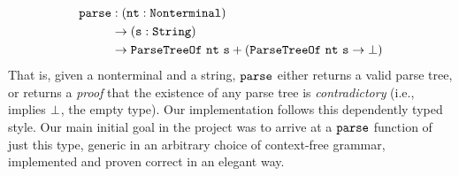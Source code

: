       \begin{align*}
        \fname{parse} & \oftypesep
        (\oftype{\farg{nt}}{\Nonterminal}) \\
        & \typeto (\oftype{\farg{s}}{\String}) \\
        & \typeto \indname{ParseTreeOf}~\farg{nt}~\farg{s} + (\indname{ParseTreeOf}~\farg{nt}~\farg{s} \typeto \False)
      \end{align*}
      That is, given a nonterminal and a string, $\texttt{parse}$ either returns a valid parse tree, or returns a \emph{proof} that the existence of any parse tree is \emph{contradictory} (i.e., implies $\bot$, the empty type).  Our implementation follows this dependently typed style.  Our main initial goal in the project was to arrive at a $\texttt{parse}$ function of just this type, generic in an arbitrary choice of context-free grammar, implemented and proven correct in an elegant way.
  